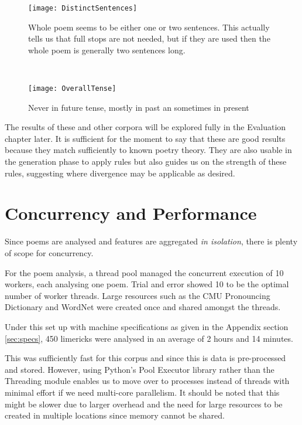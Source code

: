 \begin{figure}[t!]
\centering
\begin{minipage}[t]{.45\textwidth}
	\centering
	\texttt{[image: DistinctSentences]}
	\caption{Whole poem seems to be either one or two sentences. This actually tells us that full stops are not needed, but if they are used then the whole poem is generally two sentences long.}
	\label{fig:distinct-sentences-chart}
\end{minipage}
~
\begin{minipage}[t]{.45\textwidth}
	\centering
	\texttt{[image: OverallTense]}
	\caption{Never in future tense, mostly in past an sometimes in present}
	\label{fig:overall-tense-chart}
\end{minipage}
\end{figure}

The results of these and other corpora will be explored fully in the Evaluation chapter later. It is sufficient for the moment to say that these are good results because they match sufficiently to known poetry theory. They are also usable in the generation phase to apply rules but also guides us on the strength of these rules, suggesting where divergence may be applicable as desired.

\section{Concurrency and Performance}
\label{sec:interpret-perf}

Since poems are analysed and features are aggregated \textit{in isolation}, there is plenty of scope for concurrency.

For the poem analysis, a thread pool managed the concurrent execution of 10 workers, each analysing one poem. Trial and error showed 10 to be the optimal number of worker threads. Large resources such as the CMU Pronouncing Dictionary and WordNet were created once and shared amongst the threads.

Under this set up with machine specifications as given in the Appendix section \ref{sec:specs}, 450 limericks were analysed in an average of 2 hours and 14 minutes.

This was sufficiently fast for this corpus and since this is data is pre-processed and stored. However, using Python's Pool Executor library rather than the Threading module enables us to move over to processes instead of threads with minimal effort if we need multi-core parallelism. It should be noted that this might be slower due to larger overhead and the need for large resources to be created in multiple locations since memory cannot be shared.

